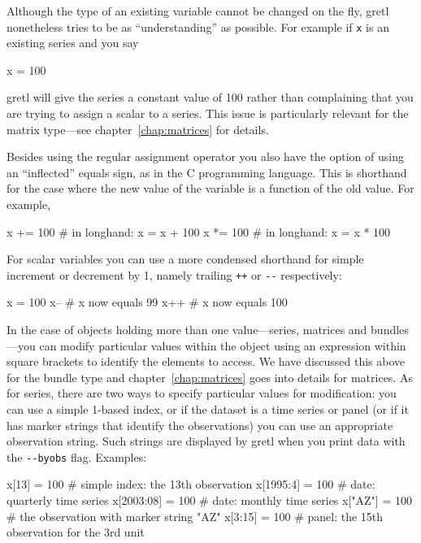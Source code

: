 Although the type of an existing variable cannot be changed on the
fly, gretl nonetheless tries to be as ``understanding'' as
possible. For example if \texttt{x} is an existing series and you say

\begin{code}
x = 100
\end{code} 

gretl will give the series a constant value of 100 rather than
complaining that you are trying to assign a scalar to a series. This
issue is particularly relevant for the matrix type---see
chapter~\ref{chap:matrices} for details.

Besides using the regular assignment operator you also have the option
of using an ``inflected'' equals sign, as in the C programming
language. This is shorthand for the case where the new value of the
variable is a function of the old value. For example,

\begin{code}
x += 100 # in longhand: x = x + 100
x *= 100 # in longhand: x = x * 100
\end{code} 

For scalar variables you can use a more condensed shorthand for simple
increment or decrement by 1, namely trailing \texttt{++} or \verb|--|
respectively:

\begin{code}
x = 100
x--     # x now equals 99
x++     # x now equals 100
\end{code}

In the case of objects holding more than one value---series, matrices
and bundles---you can modify particular values within the object using
an expression within square brackets to identify the elements to
access. We have discussed this above for the bundle type and
chapter~\ref{chap:matrices} goes into details for matrices. As for
series, there are two ways to specify particular values for
modification: you can use a simple 1-based index, or if the dataset is
a time series or panel (or if it has marker strings that identify the
observations) you can use an appropriate observation string. Such
strings are displayed by gretl when you print data with the
\verb|--byobs| flag. Examples:

\begin{code}
x[13]      = 100  # simple index: the 13th observation
x[1995:4]  = 100  # date: quarterly time series
x[2003:08] = 100  # date: monthly time series
x["AZ"]    = 100  # the observation with marker string "AZ"
x[3:15]    = 100  # panel: the 15th observation for the 3rd unit
\end{code}

